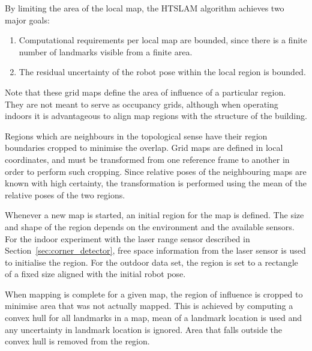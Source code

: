 By limiting the area of the local map, the HTSLAM algorithm achieves
two major goals: 
\begin{enumerate}
\item Computational requirements per local map
are bounded, since there is a finite number of landmarks visible from
a finite area.
\item The residual uncertainty of the robot pose within the local region is bounded.
\end{enumerate}

Note that these grid maps define the area of influence of a particular
region. They are not meant to serve as occupancy grids, although when
operating indoors it is advantageous to align map regions with the
structure of the building.

Regions which are neighbours in the topological sense have their region
boundaries cropped to minimise the overlap. Grid maps
are defined in local coordinates, and must be transformed
from one reference frame to another in order to perform such
cropping. Since relative poses of the neighbouring maps are known with
high certainty, the transformation is performed using the mean of the
relative poses of the two regions.


Whenever a new map is started, an initial region for the map is
defined.  The size and shape of the region depends on the environment
and the available sensors. For the indoor experiment with the laser
range sensor described in Section~\ref{sec:corner_detector}, free
space information from the laser sensor is used to initialise the
region. For the outdoor data set, the region is set to a rectangle of
a fixed size aligned with the initial robot pose.

When mapping is complete for a given map, the region of influence is
cropped to minimise area that was not actually
mapped. This is achieved by computing a convex hull for all landmarks in a map,
mean of a landmark location is used and any uncertainty in landmark
location is ignored. Area that falls outside the convex hull is
removed from the region.




